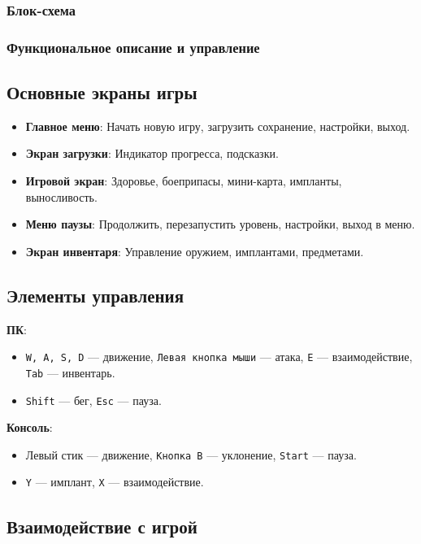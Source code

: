 \documentclass{article}
\begin{document}
\begin{itemize}
\subsubsection{Блок-схема}

\subsubsection{Функциональное описание и управление}

\subsection{Основные экраны игры}

\begin{itemize}
  \item \textbf{Главное меню}: Начать новую игру, загрузить сохранение, настройки, выход.
  \item \textbf{Экран загрузки}: Индикатор прогресса, подсказки.
  \item \textbf{Игровой экран}: Здоровье, боеприпасы, мини-карта, импланты, выносливость.
  \item \textbf{Меню паузы}: Продолжить, перезапустить уровень, настройки, выход в меню.
  \item \textbf{Экран инвентаря}: Управление оружием, имплантами, предметами.
\end{itemize}

\subsection{Элементы управления}

\textbf{ПК}:  
\begin{itemize}
  \item \texttt{W, A, S, D} — движение, \texttt{Левая кнопка мыши} — атака, \texttt{E} — взаимодействие, \texttt{Tab} — инвентарь.
  \item \texttt{Shift} — бег, \texttt{Esc} — пауза.
\end{itemize}

\textbf{Консоль}:  
\begin{itemize}
  \item Левый стик — движение, \texttt{Кнопка B} — уклонение, \texttt{Start} — пауза.
  \item \texttt{Y} — имплант, \texttt{X} — взаимодействие.
\end{itemize}

\subsection{Взаимодействие с игрой}


\end{itemize}
\end{document}
